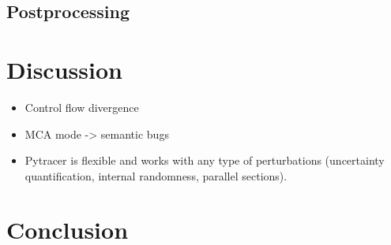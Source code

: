 \documentclass[11pt]{article}
\begin{document}

\subsection{Postprocessing}




\section{Discussion}

\begin{itemize}
    \item Control flow divergence
    \item MCA mode -> semantic bugs
    \item Pytracer is flexible and works with any type of perturbations (uncertainty quantification, internal randomness, parallel sections).

\end{itemize}

\section{Conclusion}




\appendix
\end{document}
